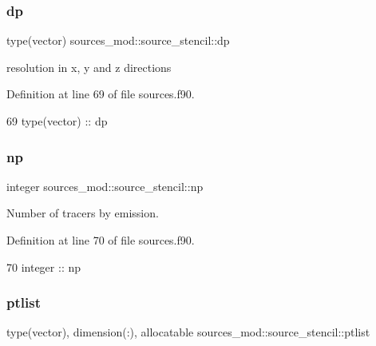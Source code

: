 \subsubsection{\texorpdfstring{dp}{dp}}
{\footnotesize\ttfamily type(vector) sources\+\_\+mod\+::source\+\_\+stencil\+::dp\hspace{0.3cm}{\ttfamily [private]}}



resolution in x, y and z directions 



Definition at line 69 of file sources.\+f90.


\begin{DoxyCode}
69         \textcolor{keywordtype}{type}(vector) :: dp
\end{DoxyCode}
\mbox{\label{structsources__mod_1_1source__stencil_a11ed46a8e923b5902cc02420d88158c5}} 
\subsubsection{\texorpdfstring{np}{np}}
{\footnotesize\ttfamily integer sources\+\_\+mod\+::source\+\_\+stencil\+::np\hspace{0.3cm}{\ttfamily [private]}}



Number of tracers by emission. 



Definition at line 70 of file sources.\+f90.


\begin{DoxyCode}
70         \textcolor{keywordtype}{integer} :: np
\end{DoxyCode}
\mbox{\label{structsources__mod_1_1source__stencil_a154e50e2872650da574d0a1148e3065a}} 
\subsubsection{\texorpdfstring{ptlist}{ptlist}}
{\footnotesize\ttfamily type(vector), dimension(\+:), allocatable sources\+\_\+mod\+::source\+\_\+stencil\+::ptlist\hspace{0.3cm}{\ttfamily [private]}}



